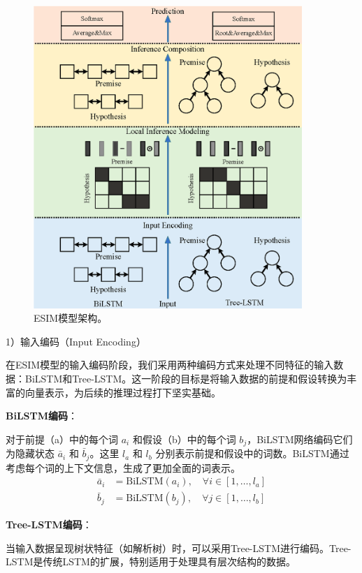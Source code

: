 \begin{figure}[th]
  \centering\includegraphics[width=4in]{figures/xulun/esim.eps}
  \caption{ESIM模型架构。}
  \label{fig1:esim}
  \end{figure}

1）输入编码（Input Encoding）

在ESIM模型的输入编码阶段，我们采用两种编码方式来处理不同特征的输入数据：BiLSTM和Tree-LSTM。这一阶段的目标是将输入数据的前提和假设转换为丰富的向量表示，为后续的推理过程打下坚实基础。

\textbf{BiLSTM编码}：

对于前提（a）中的每个词 \( a_i \) 和假设（b）中的每个词 \( b_j \)，BiLSTM网络编码它们为隐藏状态 \( \bar{a}_i \) 和 \( \bar{b}_j \)。这里 \( l_a \) 和 \( l_b \) 分别表示前提和假设中的词数。BiLSTM通过考虑每个词的上下文信息，生成了更加全面的词表示。
\begin{align}
    \bar{a}_i &= \text{BiLSTM}(a_i), \quad \forall i \in [1, \ldots, l_a] \\
    \bar{b}_j &= \text{BiLSTM}(b_j), \quad \forall j \in [1, \ldots, l_b]
\end{align}

\textbf{Tree-LSTM编码}：

当输入数据呈现树状特征（如解析树）时，可以采用Tree-LSTM进行编码。Tree-LSTM是传统LSTM的扩展，特别适用于处理具有层次结构的数据。

